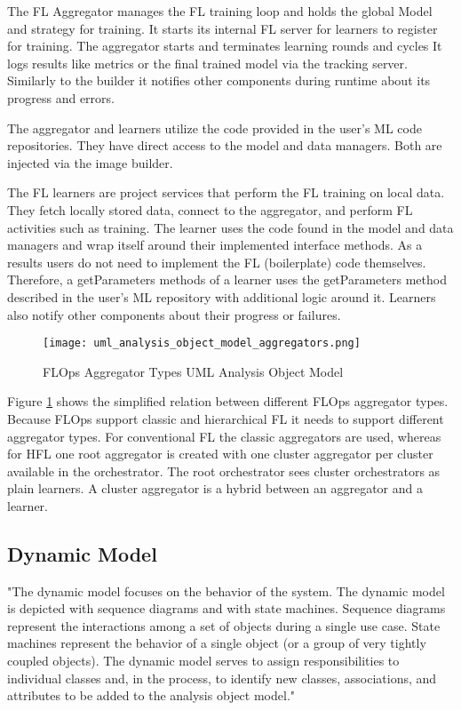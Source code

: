 The FL Aggregator manages the FL training loop and holds the global Model and strategy for training.
It starts its internal FL server for learners to register for training.
The aggregator starts and terminates learning rounds and cycles
It logs results like metrics or the final trained model via the tracking server.
Similarly to the builder it notifies other components during runtime about its progress and errors.

The aggregator and learners utilize the code provided in the user's ML code repositories.
They have direct access to the model and data managers.
Both are injected via the image builder.

The FL learners are project services that perform the FL training on local data.
They fetch locally stored data, connect to the aggregator, and perform FL activities such as training.
The learner uses the code found in the model and data managers and wrap itself around their implemented interface methods.
As a results users do not need to implement the FL (boilerplate) code themselves.
Therefore, a getParameters methods of a learner uses the getParameters method described in the user's ML repository with additional logic around it.
Learners also notify other components about their progress or failures.

\begin{figure}[h]
    \centering
    \texttt{[image: uml\_analysis\_object\_model\_aggregators.png]}
    \caption{FLOps Aggregator Types UML Analysis Object Model}
    \label{fig:uml_project_aggregators_analysis_object_model}
\end{figure}

Figure \ref{fig:uml_project_aggregators_analysis_object_model} shows the simplified relation between different FLOps aggregator types.
Because FLOps support classic and hierarchical FL it needs to support different aggregator types.
For conventional FL the classic aggregators are used, whereas for HFL one root aggregator is created with one cluster aggregator per cluster available in the orchestrator.
The root orchestrator sees cluster orchestrators as plain learners.
A cluster aggregator is a hybrid between an aggregator and a learner.








\subsection{Dynamic Model}
"The dynamic model focuses on the behavior of the system. The dynamic model is
depicted with sequence diagrams and with state machines. Sequence diagrams represent the
interactions among a set of objects during a single use case. State machines represent the
behavior of a single object (or a group of very tightly coupled objects). The dynamic model
serves to assign responsibilities to individual classes and, in the process, to identify new classes,
associations, and attributes to be added to the analysis object model."